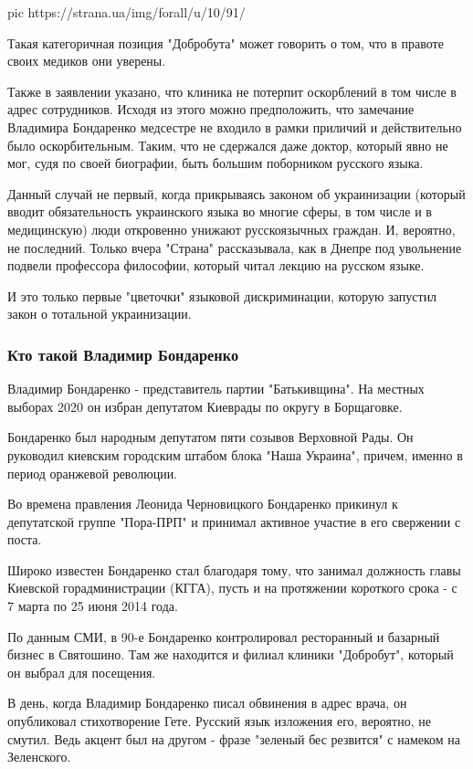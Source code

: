 \ifcmt
pic https://strana.ua/img/forall/u/10/91/%
\fi

Такая категоричная позиция "Добробута" может говорить о том, что в правоте
своих медиков они уверены.

Также в заявлении указано, что клиника не потерпит оскорблений в том числе в
адрес сотрудников. Исходя из этого можно предположить, что замечание Владимира
Бондаренко медсестре не входило в рамки приличий и действительно было
оскорбительным. Таким, что не сдержался даже доктор, который явно не мог, судя
по своей биографии, быть большим поборником русского языка.

Данный случай не первый, когда прикрываясь законом об украинизации (который
вводит обязательность украинского языка во многие сферы, в том числе и в
медицинскую) люди откровенно унижают русскоязычных граждан. И, вероятно, не
последний. Только вчера "Страна" рассказывала, как в Днепре под увольнение
подвели профессора философии, который читал лекцию на русском языке.

И это только первые "цветочки" языковой дискриминации, которую запустил закон о
тотальной украинизации.

\subsubsection{Кто такой Владимир Бондаренко}

Владимир Бондаренко - представитель партии "Батькивщина". На местных выборах
2020 он избран депутатом Киеврады по округу в Борщаговке. 

Бондаренко был народным депутатом пяти созывов Верховной Рады. Он руководил
киевским городским штабом блока "Наша Украина", причем, именно в период
оранжевой революции. 

Во времена правления Леонида Черновицкого Бондаренко прикинул к депутатской
группе "Пора-ПРП" и принимал активное участие в его свержении с поста. 

Широко известен Бондаренко стал благодаря тому, что занимал должность главы
Киевской горадминистрации (КГГА), пусть и на протяжении короткого срока - с 7
марта по 25 июня 2014 года. 

По данным СМИ, в 90-е Бондаренко контролировал ресторанный и базарный бизнес в
Святошино. Там же находится и филиал клиники "Добробут", который он выбрал для
посещения.

В день, когда Владимир Бондаренко писал обвинения в адрес врача, он опубликовал
стихотворение Гете. Русский язык изложения его, вероятно, не смутил. Ведь
акцент был на другом - фразе "зеленый бес резвится" с намеком на Зеленского. 

